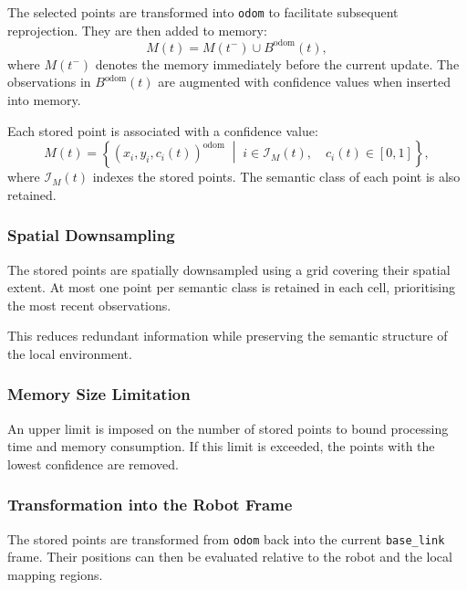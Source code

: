 \documentclass[a4paper,11pt,oneside]{book}
\begin{document}
The selected points are transformed into \texttt{odom}
to facilitate subsequent reprojection. They are then added
to memory:
\begin{equation}
    M(t)
    =
    M(t^{-})
    \cup
    B^{\mathrm{odom}}(t),
    \label{eq:local_mapping_memory_update}
\end{equation}
where $M(t^{-})$ denotes the memory immediately before the
current update. The observations in $B^{\mathrm{odom}}(t)$
are augmented with confidence values when inserted into memory.

Each stored point is associated with a confidence value:
\begin{equation}
    M(t)
    =
    \left\{
        \left(x_i,y_i,c_i(t)\right)^{\mathrm{odom}}
        \;\middle|\;
        i\in\mathcal{I}_M(t),
        \quad c_i(t)\in[0,1]
    \right\},
    \label{eq:local_mapping_memory_representation}
\end{equation}
where $\mathcal{I}_M(t)$ indexes the stored points.
The semantic class of each point is also retained.

\subsubsection{Spatial Downsampling}

The stored points are spatially downsampled using a grid
covering their spatial extent. At most one point per semantic
class is retained in each cell, prioritising the most recent
observations.

This reduces redundant information while preserving the
semantic structure of the local environment.

\subsubsection{Memory Size Limitation}

An upper limit is imposed on the number of stored points
to bound processing time and memory consumption. If this
limit is exceeded, the points with the lowest confidence
are removed.

\subsubsection{Transformation into the Robot Frame}

The stored points are transformed from \texttt{odom} back
into the current \texttt{base\_link} frame. Their positions
can then be evaluated relative to the robot and the local
mapping regions.
\end{document}
